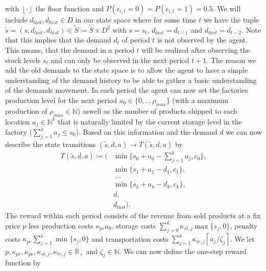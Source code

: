 \documentclass[journal, a4paper]{IEEEtran}
\theoremstyle{plain}
\theoremstyle{definition}
\begin{document}
with $\left\lfloor \cdot \right\rfloor$ the floor function and $P(\epsilon_{i,t}=0) = P(\epsilon_{i,t}=1) = 0.5$. We will include $d_{last}, d_{hist} \in D$ in our state space where for some time $t$ we have the tuple $\tilde{s} = (s, d_{last}, d_{hist}) \in \tilde{S} \coloneqq S \times D^2$ with $s = s_t$, $d_{last} = d_{t-1}$ and $d_{hist} = d_{t-2}$. Note that this implies that the demand $d_t$ of period $t$ is not observed by the agent. This means, that the demand in a period $t$ will be realized after observing the stock levels $s_t$ and can only be observed in the next period $t+1$.
The reason we add the old demands to the state space is to allow the agent to have a simple understanding of the demand history to be able to gather a basic understanding of the demands movement. In each period the agent can now set the factories production level for the next period $a_0 \in \{0,.., \rho_{max}\}$ (with a maximum production of $\rho_{max} \in \mathbb{N}$) aswell as the number of products shipped to each location $a_j \in \mathbb{N}^k$ that is naturally limited by the current storage level in the factory ($\sum_{j=1}^{k}a_j \leq s_0$). Based on this information and the demand $d$ we can now describe the state transitions $(\tilde{s}, d, a) \rightarrow T(\tilde{s},d,a)$ by
\begin{equation}
\label{eq:transition_function}
	\begin{split}
		T(\tilde{s}, d, a) \coloneqq (&\min\{s_0 + a_0 - \sum_{j=1}^{k}a_j, c_0 \}, \\
		&\min\{s_1 + a_1 - d_1, c_1 \}, \\
		&\ ... \\
		&\min\{s_k + a_k - d_k, c_k \}, \\
		&d, \\
		&d_{last}).
\end{split}
\end{equation}
The reward within each period consists of the revenue from sold products at a fix price $p$ less production costs $\kappa_{pr}a_0$, storage costs $\sum_{j=0}^{k}\kappa_{st,j} \max\{s_j, 0\}$, penalty costs $\kappa_{pe} \sum_{j=1}^{k}\min\{s_j,0\}$ and transportation costs $\sum_{j=1}^{k} \kappa_{tr, j} \left\lceil a_j / \zeta_j \right\rceil$. We let $p, \kappa_{pr}, \kappa_{pe}, \kappa_{st, j}, \kappa_{tr,j} \in \mathbb{R}_+$ and $\zeta_j \in \mathbb{N}$. We can now define the one-step reward function by
\end{document}
